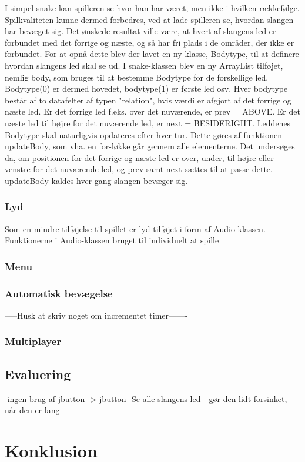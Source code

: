 \documentclass{report}
\begin{document}
I simpel-snake kan spilleren se hvor han har været, men ikke i hvilken rækkefølge. Spilkvaliteten kunne dermed forbedres, ved at lade spilleren se, hvordan slangen har bevæget sig. Det ønskede resultat ville være, at hvert af slangens led er forbundet med det forrige og næste, og så har fri plads i de områder, der ikke er forbundet.
For at opnå dette blev der lavet en ny klasse, Bodytype, til at definere hvordan slangens led skal se ud. I snake-klassen blev en ny ArrayList tilføjet, nemlig body, som bruges til at bestemme Bodytype for de forskellige led. Bodytype(0) er dermed hovedet, bodytype(1) er første led osv. Hver bodytype består af to datafelter af typen "relation", hvis værdi er afgjort af det forrige og næste led. Er det forrige led f.eks. over det nuværende, er prev = ABOVE. Er det næste led til højre for det nuværende led, er next = BESIDERIGHT.
Leddenes Bodytype skal naturligvis opdateres efter hver tur. Dette gøres af funktionen updateBody, som vha. en for-løkke går gennem alle elementerne. Det undersøges da, om positionen for det forrige og næste led er over, under, til højre eller venstre for det nuværende led, og prev samt next sættes til at passe dette. updateBody kaldes hver gang slangen bevæger sig.

\subsection{Lyd}

Som en mindre tilføjelse til spillet er lyd tilføjet i form af Audio-klassen. Funktionerne i Audio-klassen bruget til individuelt at spille 	

\subsection{Menu}

\subsection{Automatisk bevægelse}
-----Husk at skriv noget om incrementet timer-------

\subsection{Multiplayer}

\section{Evaluering}
-ingen brug af jbutton -> jbutton
-Se alle slangens led - gør den lidt forsinket, når den er lang



\chapter{Konklusion}
\end{document}
